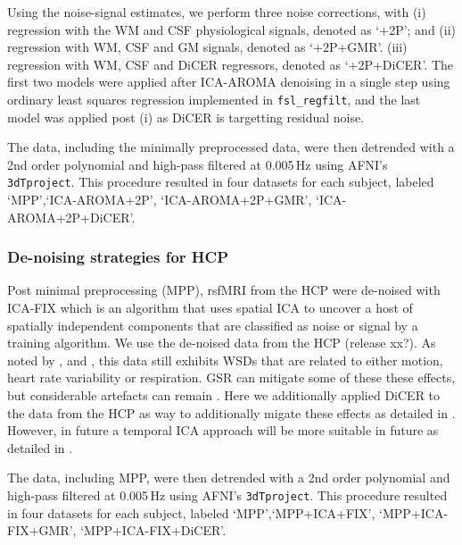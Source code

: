\documentclass[oneside]{zHenriquesLab-StyleBioRxiv}
\begin{document}
Using the noise-signal estimates, we perform three noise corrections, with
(i) regression with the WM and CSF physiological signals, denoted as `+2P'; and
(ii) regression with WM, CSF and GM signals, denoted as `+2P+GMR'.
(iii) regression with WM, CSF and DiCER regressors, denoted as `+2P+DiCER'.
The first two models were applied after ICA-AROMA denoising in a single step using ordinary least squares regression implemented in \verb|fsl_regfilt|, and the last model was applied post (i) as DiCER is targetting residual noise. 

The data, including the minimally preprocessed data, were then detrended with a 2nd order polynomial and high-pass filtered at 0.005\,Hz using AFNI's \verb|3dTproject|. This procedure resulted in four datasets for each subject, labeled `MPP',`ICA-AROMA+2P', `ICA-AROMA+2P+GMR', `ICA-AROMA+2P+DiCER'. 

\subsubsection*{De-noising strategies for HCP} 

Post minimal preprocessing (MPP), rsfMRI from the HCP were de-noised with ICA-FIX \cite{griffanti2014,glasser2016multi} which is an algorithm that uses spatial ICA to uncover a host of spatially independent components that are classified as noise or signal by a training algorithm. We use the de-noised data from the HCP (release xx?). As noted by \citet{power2017sources}, \citet{Glasser:2018dt} and \citet{aquino2019identifying}, this data still exhibits WSDs that are related to either motion, heart rate variability or respiration. GSR can mitigate some of these these effects\cite{power2019temporal}, but considerable artefacts can remain \cite{Glasser:2018dt,aquino2019identifying}. Here we additionally applied DiCER to the data from the HCP as way to additionally migate these effects as detailed in \cite{aquino2019identifying}. However, in future a temporal ICA approach will be more suitable in future as detailed in \cite{Glasser:2018dt}.

The data, including MPP, were then detrended with a 2nd order polynomial and high-pass filtered at 0.005\,Hz using AFNI's \verb|3dTproject|. This procedure resulted in four datasets for each subject, labeled `MPP',`MPP+ICA+FIX', `MPP+ICA-FIX+GMR', `MPP+ICA-FIX+DiCER'.
\end{document}
